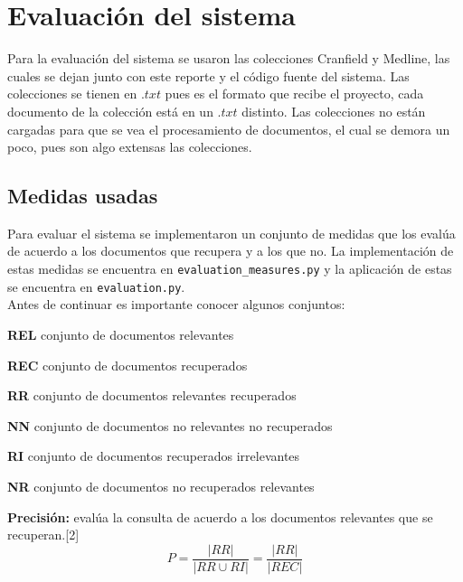 \documentclass{llncs}
\begin{document}
%
\section{Evaluaci\'on del sistema}
% 

Para la evaluaci\'on del sistema se usaron las colecciones Cranfield y Medline, las cuales se dejan junto con este reporte y el c\'odigo fuente del sistema. Las colecciones se tienen en $.txt$ pues es el formato que recibe el proyecto, cada documento de la colecci\'on est\'a en un $.txt$ distinto. Las colecciones no est\'an cargadas para que se vea el procesamiento de documentos, el cual se demora un poco, pues son algo extensas las colecciones.\\

\subsection{Medidas usadas}

Para evaluar el sistema se implementaron un conjunto de medidas que los eval\'ua de acuerdo a los documentos que recupera y a los que no. La implementaci\'on de estas medidas se encuentra en \texttt{evaluation\_measures.py} y la aplicaci\'on de estas se encuentra en \texttt{evaluation.py}.\\

Antes de continuar es importante conocer algunos conjuntos:\\

\begin{list}{-}{•}
\item \textbf{REL} conjunto de documentos relevantes
\item \textbf{REC} conjunto de documentos recuperados
\item \textbf{RR} conjunto de documentos relevantes recuperados
\item \textbf{NN} conjunto de documentos no relevantes no recuperados
\item \textbf{RI} conjunto de documentos recuperados irrelevantes
\item \textbf{NR} conjunto de documentos no recuperados relevantes
\end{list}

\textbf{Precisi\'on:} eval\'ua la consulta de acuerdo a los documentos relevantes que se recuperan.[2]\\

\begin{equation}
	P = \frac{|RR|}{|RR \cup RI|} = \frac{|RR|}{|REC|}
\end{equation}
\end{document}
